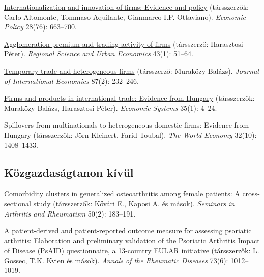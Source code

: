 \documentclass[10pt,a4paper]{article}
\newcommand{\jn}[1]{\textit{#1}}
\begin{document}
\begin{cvlist}
  \item[2013] \href{https://doi.org/10.1111/1468-0327.12020}{Internationalization and innovation of firms: Evidence and policy} (társszerzők: Carlo Altomonte, Tommaso Aquilante, Gianmarco I.P. Ottaviano). \jn{Economic Policy} 28(76): 663--700.
  \item[2013] \href{https://doi.org/10.1016/j.regsciurbeco.2012.11.004}{Agglomeration premium and trading activity of firms} (társszerző: Harasztosi Péter). \jn{Regional Science and Urban Economics} 43(1): 51--64.
  \item[2012] \href{https://doi.org/10.1016/j.jinteco.2011.12.007}{Temporary trade and heterogeneous firms} (társszerző: Muraközy Balázs). \jn{Journal of International Economics} 87(2): 232--246.
  \item[2011] \href{https://doi.org/10.1016/j.ecosys.2010.11.005}{Firms and products in international trade: Evidence from Hungary} (társszerzők: Muraközy Balázs, Harasztosi Péter). \jn{Economic Systems} 35(1): 4--24.
  \item[2009] Spillovers from multinationals to heterogeneous domestic firms: Evidence from Hungary (társszerzők: Jörn Kleinert, Farid Toubal). \jn{The World Economy} 32(10): 1408--1433.
\end{cvlist}

\subsection{Közgazdaságtanon kívül}
\begin{cvlist}
  \item[2020] \href{https://doi.org/10.1016/j.semarthrit.2019.09.001}{Comorbidity clusters in generalized osteoarthritis among female patients: A cross-sectional study} (társszerzők: Kővári E., Kaposi A. és mások). \jn{Seminars in Arthritis and Rheumatism} 50(2): 183--191.
  \item[2014] \href{https://doi.org/10.1136/annrheumdis-2014-205207}{A patient-derived and patient-reported outcome measure for assessing psoriatic arthritis: Elaboration and preliminary validation of the Psoriatic Arthritis Impact of Disease (PsAID) questionnaire, a 13-country EULAR initiative} (társszerzők: L. Gossec, T.K. Kvien és mások). \jn{Annals of the Rheumatic Diseases} 73(6): 1012--1019.
\end{cvlist}

\end{document}
